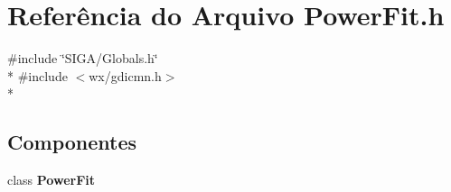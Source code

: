 \section{Referência do Arquivo Power\+Fit.\+h}
\label{_power_fit_8h}
{\ttfamily \#include \char`\"{}S\+I\+G\+A/\+Globals.\+h\char`\"{}}\\*
{\ttfamily \#include $<$wx/gdicmn.\+h$>$}\\*
\subsection*{Componentes}
\begin{DoxyCompactItemize}
\item 
class {\bf Power\+Fit}
\end{DoxyCompactItemize}
